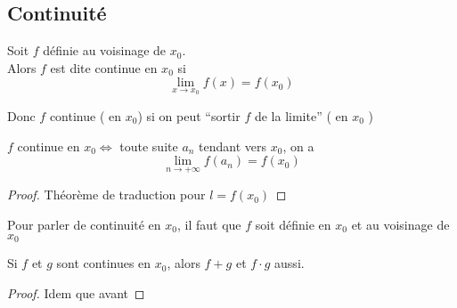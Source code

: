\documentclass[../main.tex]{subfiles}
\begin{document}
\subsection{Continuité}
\begin{defn}
	Soit $f$ définie au voisinage de $x_0$.\\
	Alors $f$ est dite continue en $ x_0$ si 
	\[ 
		\lim_{x \to x_0} f(x) =f(x_0)
	\]
	
\end{defn}
Donc $f$ continue ( en $x_0$) si on peut ``sortir $f$ de la limite'' ( en $ x_0$ )
\begin{propo}
	$f$ continue en $ x_0 \iff$ toute suite $a_n$ tendant vers $x_0$, on a
		\[ 
			\lim_{n \to  + \infty} f(a_n) = f(x_0)
		\]
		
\end{propo}
\begin{proof}
	Théorème de traduction pour $l=f(x_0)$
\end{proof}
\begin{rmq}
	Pour parler de continuité en $x_0$, il faut que $f$ soit définie en $x_0$ et au voisinage de $ x_0$
\end{rmq}
\begin{crly}
Si $f$ et $g$ sont continues en $ x_0$, alors $f+g$ et $f\cdot g$ aussi.
\end{crly}
\begin{proof}
Idem que avant
\end{proof}
\end{document}
